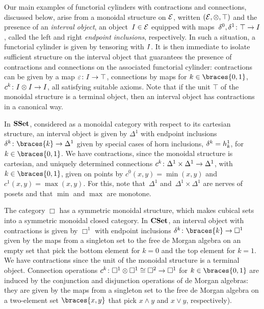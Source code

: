\documentclass[reqno,10pt,a4paper,oneside,draft]{amsart}
\begin{document}
Our main examples of functorial cylinders with  contractions and connections, discussed below, arise from a monoidal
structure on $\mathcal{E}$, written $(\mathcal{E}, \otimes, \top)$ and the presence of an \emph{interval object}, \ie an object~$I \in \mathcal{E}$ 
equipped with maps~$\delta^0, \delta^1 \colon \top \to I$, called the left 
and right \emph{endpoint inclusions}, respectively. In such a situation, a functorial cylinder is given by tensoring with $I$. 
It is then immediate to isolate sufficient structure on the interval object that guarantees the presence of contractions and connections on the associated functorial cylinder: 
contractions can be given by a map $\varepsilon \colon I \to \top$, connections by maps for $k \in \braces{0, 1}$, $c^k \colon I \otimes I \to I$,
all satisfying suitable axioms. Note that if the unit $\top$ of the monoidal structure is a terminal object, then an interval object  has contractions in a canonical way.





\begin{example} \label{exa:cyl-in-sset}
In $\mathbf{SSet}$, considered as a monoidal category with respect to its cartesian structure, 
an interval object is given by $\Delta^1$ with endpoint inclusions~$\kcyl  \co \braces{k} \to \Delta^1$ given 
by special cases of horn inclusions, $\delta^k = h^1_k$, for $k \in \braces{ 0, 1}$. We have contractions, since the monoidal structure is cartesian,
and uniquely determined connections $c^k \colon \Delta^1 \times \Delta^1 \to \Delta^1$, with $k \in \braces{0, 1}$, given on points by 
$c^0(x, y) = \min(x, y)$ and $c^1(x, y) = \max(x, y)$.
For this, note that~$\Delta^1$ and~$\Delta^1 \times \Delta^1$ are nerves of posets and that $\min$ and $\max$ are monotone.
\end{example}

\begin{example} \label{exa:cyl-in-cuset}
The category $\Box$ has a symmetric monoidal structure, which makes cubical sets into a symmetric monoidal closed category.
In $\mathbf{CSet}$, an interval object with contractions is given by $\Box^1$ with endpoint inclusions $\kcyl \co \braces{k} \to \Box^1$  given by the maps from a singleton set to the free de Morgan algebra 
on an empty set that pick the bottom element for $k = 0$ and the top element for $k =1$.
We have contractions since the unit of the monoidal structure  is a terminal object. 
Connection operations $c^k \colon \Box^1 \otimes \Box^1 \cong \Box^2 \to \Box^1$ for $k \in \braces{0, 1}$ are induced by the conjunction and disjunction operations of de Morgan algebras:
they are given by the maps from a singleton set to the free de Morgan algebra on a two-element set $\braces{x, y}$ that pick $x \wedge y$ and $x \vee y$, respectively).
\end{example}
\end{document}
